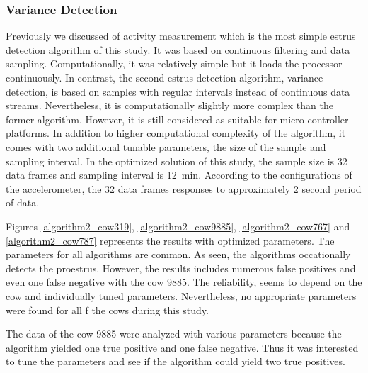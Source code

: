 \documentclass[english,12pt,a4paper,pdftex,elec,utf8]{aaltothesis}
\begin{document}
\subsubsection{Variance Detection} \label{variancedetectionevaluation}

Previously we discussed of activity measurement which is the most simple estrus detection algorithm of this study. It was based on continuous filtering and data sampling. Computationally, it was relatively simple but it loads the processor continuously. In contrast, the second estrus detection algorithm, variance detection, is based on samples with regular intervals instead of continuous data streams. Nevertheless, it is computationally slightly more complex than the former algorithm. However, it is still considered as suitable for micro-controller platforms. In addition to higher computational complexity of the algorithm, it comes with two additional tunable parameters, the size of the sample and sampling interval. In the optimized solution of this study, the sample size is 32 data frames and sampling interval is \SI{12}{\minute}. According to the configurations of the accelerometer, the 32 data frames responses to approximately 2 second period of data. 

Figures \ref{algorithm2_cow319}, \ref{algorithm2_cow9885}, \ref{algorithm2_cow767} and \ref{algorithm2_cow787} represents the results with optimized parameters. The parameters for all algorithms are common. As seen, the algorithms occationally detects the proestrus. However, the results includes numerous false positives and even one false negative with the cow 9885. The reliability, seems to depend on the cow and individually tuned parameters. Nevertheless, no appropriate parameters were found for all f the cows during this study.

The data of the cow 9885 were analyzed with various parameters because the algorithm yielded one true positive and one false negative. Thus it was interested to tune the parameters and see if the algorithm could yield two true positives.
\end{document}
